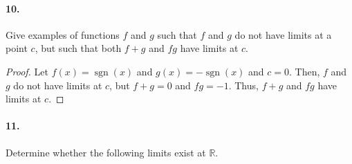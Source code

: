 \documentclass[12pt]{article}
\newcommand\R{\mathbb{R}}
\newcommand{\sgn}{\operatorname{sgn}}
\theoremstyle{remark}
\begin{document}
\paragraph{10.} Give examples of functions $f$ and $g$ such that $f$ and $g$ do not have limits at a point $c$, but such that both $f + g$ and $fg$ have limits at $c$.
\begin{proof}
    Let $f(x) = \sgn(x)$ and $g(x) = -\sgn(x)$ and $c = 0$. Then, $f$ and $g$ do not have limits at $c$, but $f + g = 0$ and $fg = -1$. Thus, $f + g$ and $fg$ have limits at $c$.
\end{proof}
\pagebreak

\paragraph{11.} Determine whether the following limits exist at $\R$.
\end{document}
